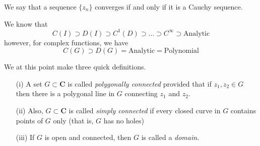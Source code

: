 \vspace{2ex}
\begin{thm}
We say that a sequence $\{z_{n}\}$ converges if and only if it is a Cauchy sequence.
\end{thm}
\vspace{2ex}
\begin{rmk}
We know that 
\[C(I)\supset D(I)\supset C^{1}(D)\supset \ldots \supset C^{\infty }\supset \mathrm{Analytic} \]
however, for complex functions, we have
\[C(G)\supset D(G)=\mathrm{Analytic}=\mathrm{Polynomial}\]
\end{rmk}
We at this point make three quick definitions.
\\
\begin{defi}
\begin{itemize}
\item[(i)] A set $G\subset {\bm C}$ is called {\it polygonally connected} provided that if $z_1,z_2\in G$ then there is a polygonal line in $G$ connecting $z_1$ and $z_2$. 
\item[(ii)] Also, $G\subset {\bm C}$ is called {\it simply connected} if every closed curve in $G$ contains points of $G$ only (that is, $G$ has no holes)
\item[(iii)] If $G$ is open and connected, then $G$ is called a {\it domain}.
\end{itemize}	
\end{defi}
\vspace{2ex}


\vspace{2ex}




